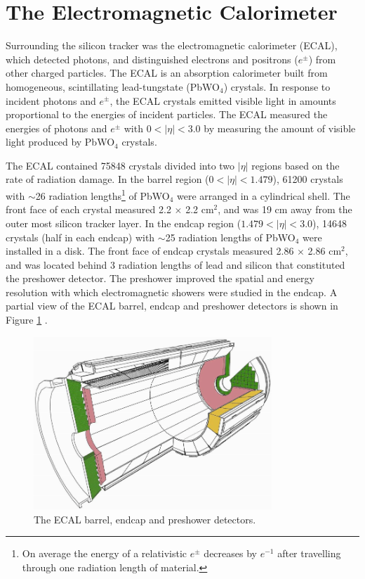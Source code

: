 \section{The Electromagnetic Calorimeter}
\label{sec:ecalDescription}
Surrounding the silicon tracker was the electromagnetic calorimeter (ECAL), which detected photons, and distinguished
electrons and positrons ($e^{\pm}$) from other charged particles.  
The ECAL is an absorption calorimeter built from homogeneous, scintillating lead-tungstate (PbWO$_{4}$) crystals.  
In response to incident photons and $e^{\pm}$, the ECAL crystals emitted visible light in amounts proportional to 
the energies of incident particles.  The ECAL measured the energies of photons and $e^{\pm}$ with $0 < |\eta| < 3.0$ by 
measuring the amount of visible light produced by PbWO$_{4}$ crystals.

The ECAL contained 75848 crystals \cite{ecalPerformanceInCollisions} divided into two $|\eta|$ regions based on the rate of radiation 
damage.  In the barrel region ($0 < |\eta| < 1.479$), 61200 
crystals with $\sim$26 radiation lengths\footnote{On average the energy of a relativistic $e^{\pm}$ decreases by $e^{-1}$ after 
travelling through one radiation length of material.} of PbWO$_{4}$ were arranged in a cylindrical shell.  The front face of 
each crystal measured 2.2 $\times$ 2.2 cm$^{2}$, and was 19 cm away from the outer most silicon tracker layer.  
In the endcap region ($1.479 < |\eta| < 3.0$), 14648 crystals (half in each 
endcap) with $\sim$25 radiation lengths of PbWO$_{4}$ were installed in a disk.  The front face of endcap crystals measured 2.86 
$\times$ 2.86 cm$^{2}$, and was located behind 3 radiation lengths of lead and silicon that constituted the preshower detector.  
The preshower improved the spatial and energy resolution with 
which electromagnetic showers were studied in the endcap.  A partial view of the ECAL barrel, endcap and 
preshower detectors is shown in Figure \ref{fig:ecalEBEEandES} \cite{ecalTDR}.

\begin{figure}[ht]
	\centering
	\includegraphics[width=0.8\textwidth]{figures/ecalBarrelEndcapAndPreshower.png}
	\caption{The ECAL barrel, endcap and preshower detectors.}
	\label{fig:ecalEBEEandES}
\end{figure}

